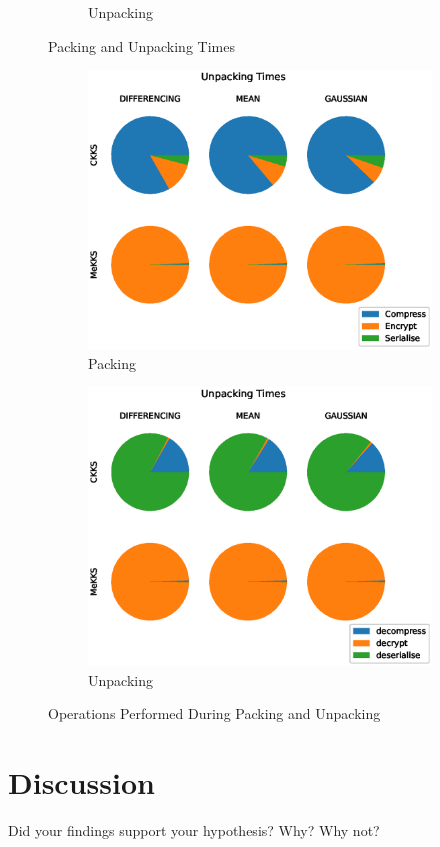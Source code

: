 \begin{figure}[h]
\begin{subfigure}[b]{0.45\textwidth}
        \caption{Unpacking}
        \label{fig:Unpacking Times}
    \end{subfigure}
    \caption{Packing and Unpacking Times}
    \label{fig:Packing and Unpacking}
\end{figure}

\begin{figure}[h] 
    \centering
    \begin{subfigure}[b]{0.45\textwidth}
        \centering
        \includegraphics[width=\textwidth]{figures/packingPieCharts.eps}
        \caption{Packing}
        \label{fig:Packing Pie}
    \end{subfigure}
    \hfill
    \begin{subfigure}[b]{0.45\textwidth}
        \centering
        \includegraphics[width=\textwidth]{figures/unpackingPieCharts.eps}
        \caption{Unpacking}
        \label{fig:Unpacking Pie}
    \end{subfigure}
    \caption{Operations Performed During Packing and Unpacking}
    \label{fig:Packing Pie Charts}
\end{figure}


\section{Discussion}

Did your findings support your hypothesis?
Why? Why not?
